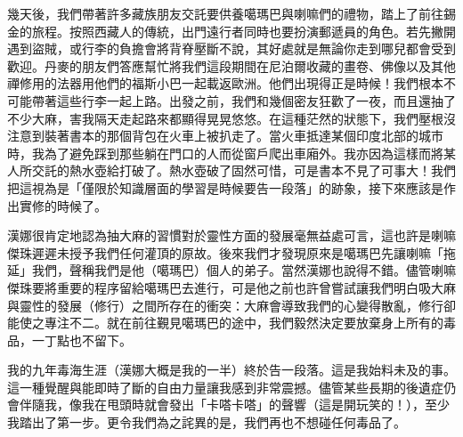 幾天後，我們帶著許多藏族朋友交託要供養噶瑪巴與喇嘛們的禮物，踏上了前往錫金的旅程。按照西藏人的傳統，出門遠行者同時也要扮演郵遞員的角色。若先撇開遇到盜賊，或行李的負擔會將背脊壓斷不說，其好處就是無論你走到哪兒都會受到歡迎。丹麥的朋友們答應幫忙將我們這段期間在尼泊爾收藏的畫卷、佛像以及其他禪修用的法器用他們的福斯小巴一起載返歐洲。他們出現得正是時候！我們根本不可能帶著這些行李一起上路。出發之前，我們和幾個密友狂歡了一夜，而且還抽了不少大麻，害我隔天走起路來都顯得晃晃悠悠。在這種茫然的狀態下，我們壓根沒注意到裝著書本的那個背包在火車上被扒走了。當火車抵達某個印度北部的城市時，我為了避免踩到那些躺在門口的人而從窗戶爬出車廂外。我亦因為這樣而將某人所交託的熱水壺給打破了。熱水壺破了固然可惜，可是書本不見了可事大！我們把這視為是「僅限於知識層面的學習是時候要告一段落」的跡象，接下來應該是作出實修的時候了。

漢娜很肯定地認為抽大麻的習慣對於靈性方面的發展毫無益處可言，這也許是喇嘛傑珠遲遲未授予我們任何灌頂的原故。後來我們才發現原來是噶瑪巴先讓喇嘛「拖延」我們，聲稱我們是他（噶瑪巴）個人的弟子。當然漢娜也說得不錯。儘管喇嘛傑珠要將重要的程序留給噶瑪巴去進行，可是他之前也許曾嘗試讓我們明白吸大麻與靈性的發展（修行）之間所存在的衝突：大麻會導致我們的心變得散亂，修行卻能使之專注不二。就在前往覲見噶瑪巴的途中，我們毅然決定要放棄身上所有的毒品，一丁點也不留下。

我的九年毒海生涯（漢娜大概是我的一半）終於告一段落。這是我始料未及的事。這一種覺醒與能即時了斷的自由力量讓我感到非常震撼。儘管某些長期的後遺症仍會伴隨我，像我在甩頭時就會發出「卡嗒卡嗒」的聲響（這是開玩笑的！），至少我踏出了第一步。更令我們為之詫異的是，我們再也不想碰任何毒品了。

